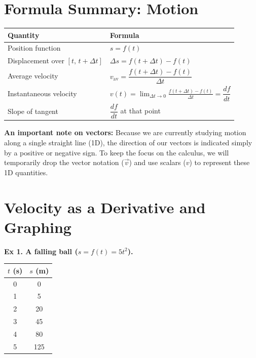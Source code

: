 \section*{Formula Summary: Motion}

\begin{formulabox}
\begin{tabular}{ll}
  \toprule
  \textbf{Quantity} & \textbf{Formula} \\
  \midrule
  Position function & $s=f(t)$ \\[4pt]
  Displacement over $[t,\,t+\Delta t]$ & $\Delta s = f(t+\Delta t)-f(t)$ \\[4pt]
  Average velocity & $v_\text{av} = \dfrac{f(t+\Delta t)-f(t)}{\Delta t}$ \\[8pt]
  Instantaneous velocity & $v(t) = \displaystyle\lim_{\Delta t\to 0}\frac{f(t+\Delta t)-f(t)}{\Delta t} = \dfrac{df}{dt}$ \\[8pt]
  Slope of tangent & $\dfrac{df}{dt}$ at that point \\
  \bottomrule
\end{tabular}
\end{formulabox}

\medskip
\textbf{An important note on vectors:} Because we are currently studying motion along a
single straight line (1D), the direction of our vectors is indicated simply by a positive or
negative sign. To keep the focus on the calculus, we will temporarily drop the vector notation
($\vec{v}$) and use scalars ($v$) to represent these 1D quantities.


\section{Velocity as a Derivative and Graphing}

\textbf{Ex 1. A falling ball ($s=f(t)=5t^2$).}

\begin{center}
\begin{tabular}{cc}
  \toprule
  $t$ (s) & $s$ (m) \\
  \midrule
  0 & 0 \\
  1 & 5 \\
  2 & 20 \\
  3 & 45 \\
  4 & 80 \\
  5 & 125 \\
  \bottomrule
\end{tabular}
\end{center}

